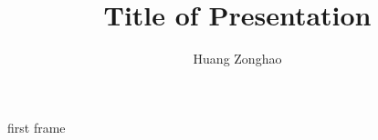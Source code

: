 \documentclass[draft]{beamer}
\title{Title of Presentation}
\author{Huang Zonghao}
\begin{document}
\begin{frame}
\titlepage
\end{frame}

\begin{frame}{first frame}
\end{frame}
\end{document}
